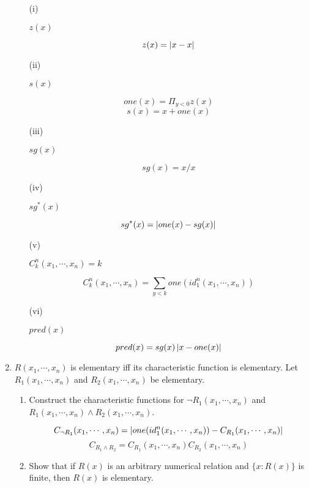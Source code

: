 \begin{enumerate}
    \begin{enumerate}
      \item [(i)]
        \begin{question} $z(x)$ \end{question}
        $$z(x) = \left\vert x-x \right\vert$$
      \item [(ii)]
        \begin{question} $s(x)$ \end{question}
        $$one(x) = \Pi_{y < 0} z(x)$$
        $$s(x) = x + one(x)$$
      \item [(iii)]
        \begin{question} $sg(x)$ \end{question}
        $$sg(x) = x/x$$
      \item [(iv)]
        \begin{question} $sg^*(x)$ \end{question}
        $$sg^*(x) = \left\vert one(x) - sg(x) \right\vert$$
      \item [(v)]
        \begin{question} $C^n_k(x_1,\cdots,x_n)=k$ \end{question}
        $$C^n_k(x_1, \cdots, x_n) = \sum_{y < k} one(id_1^n(x_1, \cdots, x_n))$$
      \item [(vi)]
        \begin{question} $pred(x)$ \end{question}
        $$pred(x) = sg(x)\left\vert x - one(x) \right\vert$$
        
    \end{enumerate}


  \item
    \begin{question}
      $R(x_1, \cdots, x_n)$ is elementary iff its characteristic function is elementary. Let $R_1(x_1, \cdots, x_n)$ and $R_2(x_1, \cdots, x_n)$ be elementary.
    \end{question}

    \begin{enumerate}
      \item
        \begin{question}
          Construct the characteristic functions for $\neg R_1(x_1,\cdots,x_n)$ and $R_1(x_1,\cdots,x_n) \land R_2(x_1,\cdots,x_n)$.
        \end{question}

        $$C_{\neg R_1}(x_1, \cdots, x_n) = \left\vert one(id_1^n(x_1, \cdots, x_n)) - C_{R_1}(x_1, \cdots, x_n) \right\vert$$
        $$C_{R_1 \land R_2} = C_{R_1}(x_1, \cdots, x_n) C_{R_2}(x_1, \cdots, x_n)$$
      \item
        \begin{question}
          Show that if $R(x)$ is an arbitrary numerical relation and $\{ x : R(x) \}$ is finite, then $R(x)$ is elementary.
        \end{question}


\end{enumerate}
\end{enumerate}
